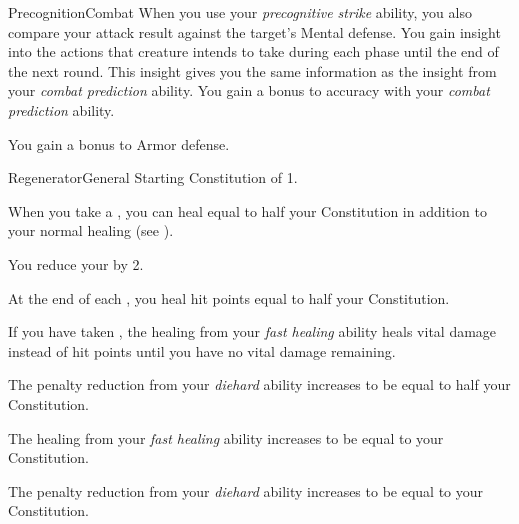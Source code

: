 \begin{feat}{Precognition}{Combat}
         When you use your \textit{precognitive strike} ability, you also compare your attack result against the target's Mental defense.
        \hit You gain insight into the actions that creature intends to take during each phase until the end of the next round.
        This insight gives you the same information as the insight from your \textit{combat prediction} ability.
        You gain a  bonus to accuracy with your \textit{combat prediction} ability.

         You gain a  bonus to Armor defense.
    \end{feat}

    \begin{feat}{Regenerator}{General}
        \featpre Starting Constitution of 1.

         When you take a , you can heal  equal to half your Constitution in addition to your normal healing (see ).

         You reduce your  by 2.

         At the end of each , you heal hit points equal to half your Constitution.

         If you have taken , the healing from your \textit{fast healing} ability heals vital damage instead of hit points until you have no vital damage remaining.

         The penalty reduction from your \textit{diehard} ability increases to be equal to half your Constitution.

         The healing from your \textit{fast healing} ability increases to be equal to your Constitution.

         The penalty reduction from your \textit{diehard} ability increases to be equal to your Constitution.
    \end{feat}

